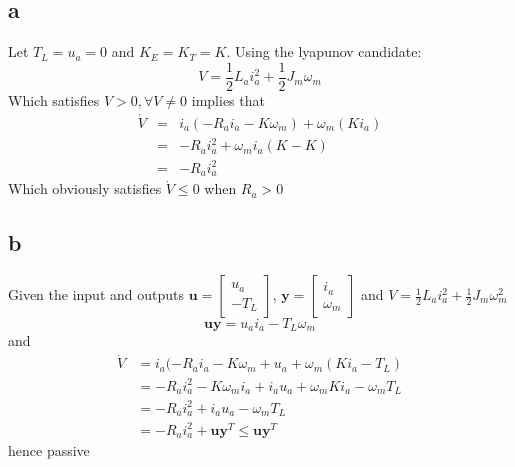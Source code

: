 \documentclass[11pt]{article}
\begin{document}
\subsection*{a}
Let $T_L = u_a = 0$ and $K_E = K_T = K$. Using the lyapunov candidate:
\[V = \frac{1}{2} L_a i_a^2 + \frac{1}{2} J_m \omega_m\]
Which satisfies $V > 0, \forall V \not = 0$ implies that
\begin{eqnarray*}
\dot{V} &=& i_a(-R_a i_a - K \omega_m) + \omega_m(K i_a) \\
&=& -R_a i_a^2 + \omega_m i_a (K - K) \\
&=& -R_a i_a^2
\end{eqnarray*}
Which obviously satisfies $\dot{V} \leq 0$ when $R_a > 0$

\subsection*{b}
Given the input and outputs $\mathbf{u} = \begin{bmatrix} u_a \\ -T_L \end{bmatrix}$, $\mathbf{y} = \begin{bmatrix} i_a \\ \omega_m \end{bmatrix}$ and $V = \frac{1}{2} L_a i_a^2 + \frac{1}{2} J_m \omega_m^2$
\[\mathbf{u} \mathbf{y} = u_a i_a - T_L \omega_m\]
and
\begin{eqnarray*}
\dot{V} &= i_a(-R_a i_a - K \omega_m + u_a + \omega_m ( K i_a - T_L) \\
&= - R_a i_a^2 - K \omega_m i_a + i_a u_a + \omega_m K i_a - \omega_m T_L \\
&= - R_a i_a^2 + i_a u_a - \omega_m T_L \\
&= - R_a i_a^2 + \mathbf{u} \mathbf{y}^T \leq \mathbf{u} \mathbf{y}^T
\end{eqnarray*}
hence passive
\end{document}
